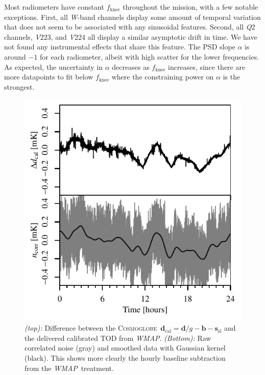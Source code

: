 \documentclass[twocolumn]{../../common/aa}
\def\WMAP{\emph{WMAP}}
\newcommand{\cosmoglobe}{\textsc{Cosmoglobe}}
\newcommand{\Q}[0]{\textit Q}
\newcommand{\V}[0]{\textit V}
\newcommand{\W}[0]{\textit W}
\begin{document}
Most radiometers have constant $f_\mathrm{knee}$ throughout the mission, with a few notable exceptions. First, all \W-band channels display some amount of temporal variation that does not seem to be associated with any sinusoidal features. Second, all \Q2 channels, \V223, and \V224 all display a similar asymptotic drift in time. We have not found any instrumental effects that share this feature.
The PSD slope $\alpha$ is around $-1$ for each radiometer, albeit with high scatter for the lower frequencies. As expected, the uncertainty in $\alpha$ decreases as $f_\mathrm{knee}$ increases, since there are more datapoints to fit below $f_\mathrm{knee}$ where the constraining power on $\alpha$ is the strongest.

\begin{figure}
	\includegraphics[width=\columnwidth]{figures/K113_TOD_diff_10hr.pdf}
	\caption{\textit{(top):} Difference between the \cosmoglobe\ $\boldsymbol d_\mathrm{cal}=\boldsymbol d/g-\boldsymbol b - \boldsymbol s_\mathrm{sl}$ and the delivered calibrated TOD from \WMAP. \textit{(Bottom):} Raw correlated noise (gray) and smoothed data with Gaussian kernel (black). This shows more clearly the hourly baseline subtraction from the \WMAP\ treatment.}
	\label{fig:cal_comp}
\end{figure}
\end{document}
